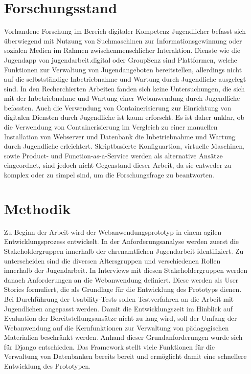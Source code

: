 \documentclass[
    12pt,
    ngerman,
    a4paper,
    oneside
]{book}
\begin{document}
\section*{Forschungsstand}
Vorhandene Forschung im Bereich digitaler Kompetenz Jugendlicher befasst sich überwiegend mit Nutzung von Suchmaschinen zur Informationsgewinnung oder sozialen Medien im Rahmen zwischenmenschlicher Interaktion.\cite{schaumburg2019nutzung}\cite{hartmann2020digitale}
Dienste wie die Jugendapp von jugendarbeit.digital oder GroupSenz sind Plattformen, welche Funktionen zur Verwaltung von Jugendangeboten bereitstellen, allerdings nicht auf die selbstständige Inbetriebnahme und Wartung durch Jugendliche ausgelegt sind.\cite{jugendarbeit.digital}\cite{groupsenz}
In den Recherchierten Arbeiten fanden sich keine Untersuchungen, die sich mit der Inbetriebnahme und Wartung einer Webanwendung durch Jugendliche befassten.
Auch die Verwendung von Containerisierung zur Einrichtung von digitalen Diensten durch Jugendliche ist kaum erforscht.
Es ist daher unklar, ob die Verwendung von Containerisierung im Vergleich zu einer manuellen Installation von Webserver und Datenbank die Inbetriebnahme und Wartung durch Jugendliche erleichtert.
Skriptbasierte Konfiguartion, virtuelle Maschinen, sowie Product- und Function-as-a-Service werden als alternative Ansätze eingeordnet, sind jedoch nicht Gegenstand dieser Arbeit, da sie entweder zu komplex oder zu simpel sind, um die Forschungsfrage zu beantworten.

\section*{Methodik}
Zu Beginn der Arbeit wird der Webanwendungsprototyp in einem agilen Entwicklungsprozess entwickelt.\cite{tremp2022agile}
In der Anforderungsanalyse werden zuerst die Stakeholdergruppen innerhalb der ehrenamtlichen Jugendarbeit identifiziert.
Zu unterscheiden sind die diversen Altersgruppen und verschiedenen Rollen innerhalb der Jugendarbeit.
In Interviews mit diesen Stakeholdergruppen werden danach Anforderungen an die Webanwendung definiert.
Diese werden als User Stories formuliert, die als Grundlage für die Entwicklung des Prototyps dienen.
Bei Durchführung der Usability-Tests sollen Testverfahren an die Arbeit mit Jugendlichen angepasst werden.\cite{Rose2018}
Damit die Entwicklungszeit im Hinblick auf Evaluation der Bereitstellungsansätze nicht zu lang wird, soll der Umfang der Webanwendung auf die Kernfunktionen zur Verwaltung von pädagogischen Materialien beschränkt werden.
Anhand dieser Grundanforderungen wurde sich für Django entschieden.
Das Framework stellt viele Funktionen für die Verwaltung von Datenbanken bereits bereit und ermöglicht damit eine schnellere Entwicklung des Prototypen.\cite{djangoDocs}
\end{document}
